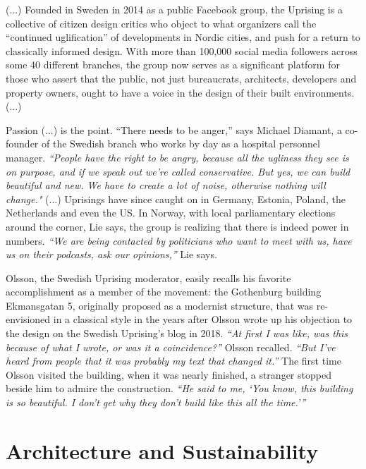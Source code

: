 \documentclass[a4paper]{article}
\begin{document}
(...) Founded in Sweden in 2014 as a public Facebook group, the Uprising is a collective of citizen design critics who object to what organizers call the “continued uglification” of developments in Nordic cities, and push for a return to classically informed design. With more than 100,000 social media followers across some 40 different branches, the group now serves as a significant platform for those who assert that the public, not just bureaucrats, architects, developers and property owners, ought to have a voice in the design of their built environments. (...)

Passion (...) is the point. “There needs to be anger,” says Michael Diamant, a co-founder of the Swedish branch who works by day as a hospital personnel manager. \textit{“People have the right to be angry, because all the ugliness they see is on purpose, and if we speak out we’re called conservative. But yes, we can build beautiful and new. We have to create a lot of noise, otherwise nothing will change." }(...) Uprisings have since caught on in Germany, Estonia, Poland, the Netherlands and even the US. In Norway, with local parliamentary elections around the corner, Lie says, the group is realizing that there is indeed power in numbers. \textit{“We are being contacted by politicians who want to meet with us, have us on their podcasts, ask our opinions,”} Lie says.

Olsson, the Swedish Uprising moderator, easily recalls his favorite accomplishment as a member of the movement: the Gothenburg building Ekmansgatan 5, originally proposed as a modernist structure, that was re-envisioned in a classical style in the years after Olsson wrote up his objection to the design on the Swedish Uprising’s blog in 2018. \textit{“At first I was like, was this because of what I wrote, or was it a coincidence?”} Olsson recalled. \textit{“But I’ve heard from people that it was probably my text that changed it.”} The first time Olsson visited the building, when it was nearly finished, a stranger stopped beside him to admire the construction. \textit{“He said to me, ‘You know, this building is so beautiful. I don’t get why they don’t build like this all the time.’”}

\clearpage

\section{Architecture and Sustainability}



\clearpage

\printbibliography
\end{document}
